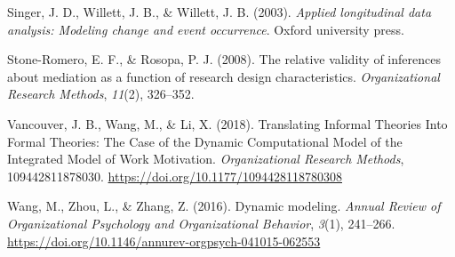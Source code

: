 \documentclass[english,,man]{apa6}
\begin{document}
\leavevmode\hypertarget{ref-singer_applied_2003}{}%
Singer, J. D., Willett, J. B., \& Willett, J. B. (2003). \emph{Applied longitudinal data analysis: Modeling change and event occurrence}. Oxford university press.

\leavevmode\hypertarget{ref-stone2008relative}{}%
Stone-Romero, E. F., \& Rosopa, P. J. (2008). The relative validity of inferences about mediation as a function of research design characteristics. \emph{Organizational Research Methods}, \emph{11}(2), 326--352.

\leavevmode\hypertarget{ref-vancouver_translating_2018}{}%
Vancouver, J. B., Wang, M., \& Li, X. (2018). Translating Informal Theories Into Formal Theories: The Case of the Dynamic Computational Model of the Integrated Model of Work Motivation. \emph{Organizational Research Methods}, 109442811878030. \url{https://doi.org/10.1177/1094428118780308}

\leavevmode\hypertarget{ref-Wang2016}{}%
Wang, M., Zhou, L., \& Zhang, Z. (2016). Dynamic modeling. \emph{Annual Review of Organizational Psychology and Organizational Behavior}, \emph{3}(1), 241--266. \url{https://doi.org/10.1146/annurev-orgpsych-041015-062553}
\end{document}
